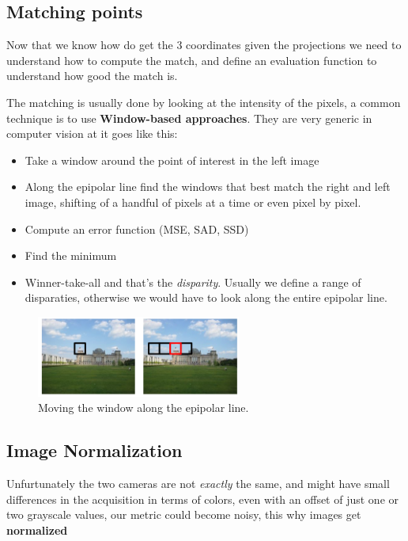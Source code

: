 \subsection{Matching points}

Now that we know how do get the 3 coordinates given the projections we need to understand how to compute the match, and define an evaluation function to understand how good the match is. 

The matching is usually done by looking at the intensity of the pixels, a common technique is to use \textbf{Window-based approaches}. They are very generic in computer vision at it goes like this:

\begin{itemize}
    \item Take a window around the point of interest in the left image
    \item Along the epipolar line find the windows that best match the right and left image, shifting of a handful of pixels at a time or even pixel by pixel.
    \item Compute an error function (MSE, SAD, SSD)
    \item Find the minimum
    \item Winner-take-all and that's the \textit{disparity}. Usually we define a range of disparaties, otherwise we would have to look along the entire epipolar line.
\end{itemize}

\begin{figure}[H]
    \centering
    \includegraphics[width=0.6\textwidth]{Figures/sad.png}
    \caption{Moving the window along the epipolar line.}
    \label{fig:sad}
\end{figure}



\subsection{Image Normalization}

Unfurtunately the two cameras are not \textit{exactly} the same, and might have small differences in the acquisition in terms of colors, even with an offset of just one or two grayscale values, our metric could become noisy, this why images get \textbf{normalized}


